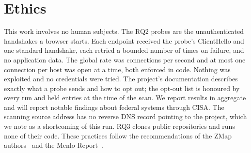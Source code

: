 \section{Ethics}
\label{sec:ethics}

This work involves no human subjects. 
The RQ2 probes are the unauthenticated handshakes a browser starts. Each
endpoint received the probe's ClientHello and one standard handshake, each
retried a bounded number of times on failure, and no application data. The global rate was
 connections per second and at most one connection per host
was open at a time, both enforced in code. Nothing was exploited and no
credentials were tried. The project's documentation describes exactly what a
probe sends and how to opt out; the opt-out list is honoured by every run and
held  entries at the time of the scan. We report results
in aggregate and will report notable findings about federal systems through
CISA. The scanning source address has no reverse DNS record pointing to the
project, which we note as a shortcoming of this run. RQ3 clones public
repositories and runs none of their code. These practices follow the
recommendations of the ZMap authors~\cite{zmap} and the Menlo
Report~\cite{menlo}.
